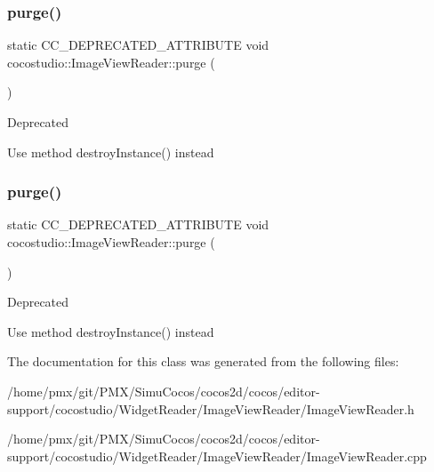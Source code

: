 \subsubsection{\texorpdfstring{purge()}{purge()}\hspace{0.1cm}{\footnotesize\ttfamily [1/2]}}
{\footnotesize\ttfamily static C\+C\+\_\+\+D\+E\+P\+R\+E\+C\+A\+T\+E\+D\+\_\+\+A\+T\+T\+R\+I\+B\+U\+TE void cocostudio\+::\+Image\+View\+Reader\+::purge (\begin{DoxyParamCaption}{ }\end{DoxyParamCaption})\hspace{0.3cm}{\ttfamily [static]}}

\begin{DoxyRefDesc}{Deprecated}
\item[\hyperlink{deprecated__deprecated000089}{Deprecated}]Use method destroy\+Instance() instead \end{DoxyRefDesc}
\mbox{\label{classcocostudio_1_1ImageViewReader_a49200992465644cb23ea821ca066d8b3}} 
\subsubsection{\texorpdfstring{purge()}{purge()}\hspace{0.1cm}{\footnotesize\ttfamily [2/2]}}
{\footnotesize\ttfamily static C\+C\+\_\+\+D\+E\+P\+R\+E\+C\+A\+T\+E\+D\+\_\+\+A\+T\+T\+R\+I\+B\+U\+TE void cocostudio\+::\+Image\+View\+Reader\+::purge (\begin{DoxyParamCaption}{ }\end{DoxyParamCaption})\hspace{0.3cm}{\ttfamily [static]}}

\begin{DoxyRefDesc}{Deprecated}
\item[\hyperlink{deprecated__deprecated000324}{Deprecated}]Use method destroy\+Instance() instead \end{DoxyRefDesc}


The documentation for this class was generated from the following files\+:\begin{DoxyCompactItemize}
\item 
/home/pmx/git/\+P\+M\+X/\+Simu\+Cocos/cocos2d/cocos/editor-\/support/cocostudio/\+Widget\+Reader/\+Image\+View\+Reader/Image\+View\+Reader.\+h\item 
/home/pmx/git/\+P\+M\+X/\+Simu\+Cocos/cocos2d/cocos/editor-\/support/cocostudio/\+Widget\+Reader/\+Image\+View\+Reader/Image\+View\+Reader.\+cpp\end{DoxyCompactItemize}
